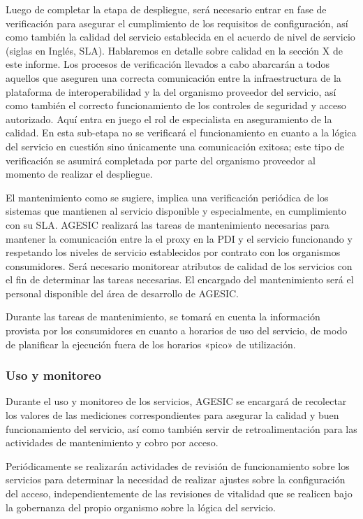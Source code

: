 \documentclass[11pt]{article}
\begin{document}
				Luego de completar la etapa de despliegue, será necesario entrar en fase de verificación para asegurar el cumplimiento de los requisitos de configuración, así como también la calidad del servicio establecida en el acuerdo de nivel de servicio (siglas en Inglés, SLA). Hablaremos en detalle sobre calidad en la sección X de este informe. Los procesos de verificación llevados a cabo abarcarán a todos aquellos que aseguren una correcta comunicación entre la infraestructura de la plataforma de interoperabilidad y la del organismo proveedor del servicio, así como también el correcto funcionamiento de los controles de seguridad y acceso autorizado. Aquí entra en juego el rol de especialista en aseguramiento de la calidad. En esta sub-etapa no se verificará el funcionamiento en cuanto a la lógica del servicio en cuestión sino únicamente una comunicación exitosa; este tipo de verificación se asumirá completada por parte del organismo proveedor al momento de realizar el despliegue.

				El mantenimiento como se sugiere, implica una verificación periódica de los sistemas que mantienen al servicio disponible y especialmente, en cumplimiento con su SLA. AGESIC realizará las tareas de mantenimiento necesarias para mantener la comunicación entre la el proxy en la PDI y el servicio funcionando y respetando los niveles de servicio establecidos por contrato con los organismos consumidores. Será necesario monitorear atributos de calidad de los servicios con el fin de determinar las tareas necesarias. El encargado del mantenimiento será el personal disponible del área de desarrollo de AGESIC.

				Durante las tareas de mantenimiento, se tomará en cuenta la información provista por los consumidores en cuanto a horarios de uso del servicio, de modo de planificar la ejecución fuera de los horarios «pico» de utilización.

			\subsubsection{Uso y monitoreo}
				Durante el uso y monitoreo de los servicios, AGESIC se encargará de recolectar los valores de las mediciones correspondientes para asegurar la calidad y buen funcionamiento del servicio, así como también servir de retroalimentación para las actividades de mantenimiento y cobro por acceso.

				Periódicamente se realizarán actividades de revisión de funcionamiento sobre los servicios para determinar la necesidad de realizar ajustes sobre la configuración del acceso, independientemente de las revisiones de vitalidad que se realicen bajo la gobernanza del propio organismo sobre la lógica del servicio.
\end{document}

